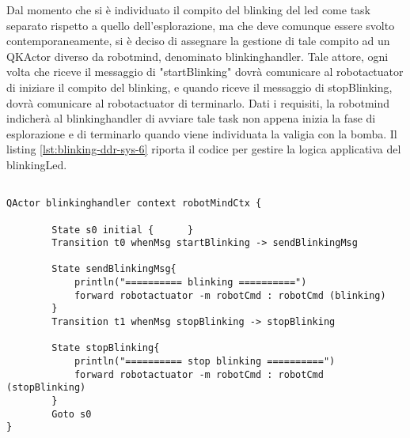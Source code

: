 Dal momento che si è individuato il compito del blinking del led come task separato rispetto a quello dell'esplorazione, ma che deve comunque essere svolto contemporaneamente, si è deciso di assegnare la gestione di tale compito ad un QKActor diverso da robotmind, denominato blinkinghandler. Tale attore, ogni volta che riceve il messaggio di "startBlinking" dovrà comunicare al robotactuator di iniziare il compito del blinking, e quando riceve il messaggio di stopBlinking, dovrà comunicare al robotactuator di terminarlo.
Dati i requisiti, la robotmind indicherà al blinkinghandler di avviare tale task non appena inizia la fase di esplorazione e di terminarlo quando viene individuata la valigia con la bomba.
Il listing \ref{lst:blinking-ddr-sys-6} riporta il codice per gestire la logica applicativa del blinkingLed.


\begin{lstlisting}[backgroundcolor=\color{white}, label={lst:blinking-ddr-sys-6}, caption={"Codice di blinkinghandler in ddrSystem6"}]

QActor blinkinghandler context robotMindCtx {
	
		State s0 initial {		}
		Transition t0 whenMsg startBlinking -> sendBlinkingMsg
		
		State sendBlinkingMsg{
			println("========== blinking ==========")
			forward robotactuator -m robotCmd : robotCmd (blinking)
		}
		Transition t1 whenMsg stopBlinking -> stopBlinking
		
		State stopBlinking{
			println("========== stop blinking ==========")
			forward robotactuator -m robotCmd : robotCmd (stopBlinking)
		}		
		Goto s0
}
\end{lstlisting}